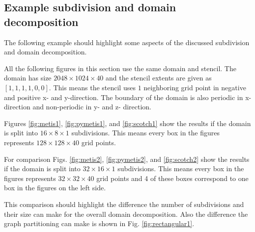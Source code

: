 \subsection{Example subdivision and domain decomposition}
\label{sec:examplesubdivision}
The following example should highlight some aspects of the discussed subdivision and domain decomposition.

All the following figures in this section use the same domain and stencil.
The domain has size $2048 \times 1024 \times 40$ and the stencil extents are given as $\left[1, 1, 1, 1, 0, 0\right]$.
This means the stencil uses $1$ neighboring grid point in negative and positive x- and y-direction.
The boundary of the domain is also periodic in x-direction and non-periodic in y- and z- direction.

Figures \ref{fig:metis1}, \ref{fig:pymetis1}, and \ref{fig:scotch1} show the results if the domain is split into $16 \times 8 \times 1$ subdivisions.
This means every box in the figures represents $128 \times 128 \times 40$ grid points.

For comparison Figs. \ref{fig:metis2}, \ref{fig:pymetis2}, and \ref{fig:scotch2} show the results if the domain is split into $32 \times 16 \times 1$ subdivisions.
This means every box in the figures represents $32 \times 32 \times 40$ grid points and 4 of these boxes correspond to one box in the figures on the left side.

This comparison should highlight the difference the number of subdivisions and their size can make for the overall domain decomposition.
Also the difference the graph partitioning can make is shown in Fig. \ref{fig:rectangular1}.


